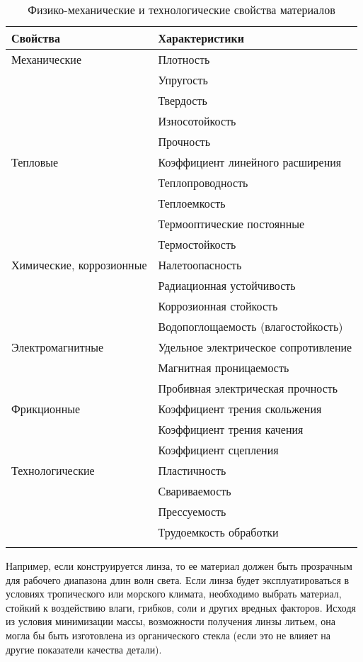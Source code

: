 \begin{table}[h!]
	\selectfont
	\begin{tabular}{ll} \hline
		\toprule
		Свойства & Характеристики \\ 
		\midrule
		Механические & Плотность\\ 
		& Упругость \\ 
		& Твердость \\
		& Износотойкость \\
		& Прочность\\ \hline
		Тепловые & Коэффициент линейного расширения\\
		& Теплопроводность \\
		& Теплоемкость \\
		& Термооптические постоянные \\
		& Термостойкость \\ \hline
        Химические, коррозионные & Налетоопасность \\
        & Радиационная устойчивость \\
        & Коррозионная стойкость \\
        & Водопоглощаемость (влагостойкость)\\ \hline
        Электромагнитные & Удельное электрическое сопротивление \\
        & Магнитная проницаемость \\
        & Пробивная электрическая прочность\\ \hline
        Фрикционные & Коэффициент трения скольжения \\
        & Коэффициент трения качения \\
        & Коэффициент сцепления \\ \hline
        Технологические  & Пластичность \\
        & Свариваемость \\
        & Прессуемость \\
        & Трудоемкость обработки \\
        \bottomrule \\
	\end{tabular}
	\caption{Физико-механические и технологические свойства материалов}
	\label{tab:prop}
\end{table}

Например, если конструируется линза, то ее материал должен быть прозрачным для рабочего диапазона длин волн света. Если линза будет эксплуатироваться в условиях тропического или морского климата, необходимо выбрать материал, стойкий к воздействию влаги, грибков, соли и других вредных факторов. Исходя из условия минимизации массы, возможности получения линзы литьем, она могла бы быть изготовлена из органического стекла (если это не влияет на другие показатели качества детали).

